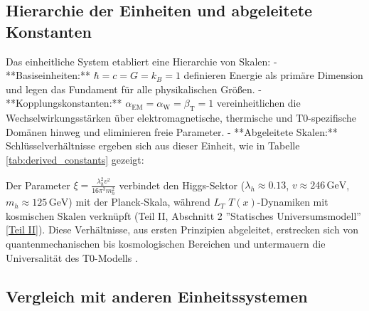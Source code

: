 \documentclass[12pt,a4paper]{article}
\newcommand{\Tfield}{T(x)}
\newcommand{\alphaEM}{\alpha_{\text{EM}}}
\newcommand{\alphaW}{\alpha_{\text{W}}}
\newcommand{\betaT}{\beta_{\text{T}}}
\begin{document}
	\subsection{Hierarchie der Einheiten und abgeleitete Konstanten}
	\label{subsec:hierarchy}
	
	Das einheitliche System etabliert eine Hierarchie von Skalen:
	- **Basiseinheiten:** \(\hbar = c = G = k_B = 1\) definieren Energie als primäre Dimension und legen das Fundament für alle physikalischen Größen.
	- **Kopplungskonstanten:** \(\alphaEM = \alphaW = \betaT = 1\) vereinheitlichen die Wechselwirkungsstärken über elektromagnetische, thermische und T0-spezifische Domänen hinweg und eliminieren freie Parameter.
	- **Abgeleitete Skalen:** Schlüsselverhältnisse ergeben sich aus dieser Einheit, wie in Tabelle \ref{tab:derived_constants} gezeigt:
	\begin{table}[ht]
		\centering
		\caption{Abgeleitete Konstanten im T0-Modell, die Skalenhierarchien repräsentieren.}
		\label{tab:derived_constants}
	\end{table}
	
	Der Parameter \(\xi = \frac{\lambda_h^2 v^2}{16\pi^3 m_h^2}\) verbindet den Higgs-Sektor (\(\lambda_h \approx 0.13\), \(v \approx 246 \, \text{GeV}\), \(m_h \approx 125 \, \text{GeV}\)) mit der Planck-Skala, während \(L_T\) \(\Tfield\)-Dynamiken mit kosmischen Skalen verknüpft (Teil II, Abschnitt 2 ''Statisches Universumsmodell'' \href{https://github.com/jpascher/T0-Time-Mass-Duality/tree/main/2/pdf/Deutsch/QMRelTimeMassPart2.pdf}{[Teil II]}). Diese Verhältnisse, aus ersten Prinzipien abgeleitet, erstrecken sich von quantenmechanischen bis kosmologischen Bereichen und untermauern die Universalität des T0-Modells \cite{pascher_alphabeta_2025}.
	
	\subsection{Vergleich mit anderen Einheitssystemen}
	\label{subsec:unit_comparison}
	
\end{document}

